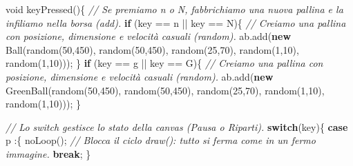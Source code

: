 \documentclass[
]{article}
\newenvironment{Shaded}{}{}
\newcommand{\CharTok}[1]{\textcolor[rgb]{0.25,0.44,0.63}{#1}}
\newcommand{\CommentTok}[1]{\textcolor[rgb]{0.38,0.63,0.69}{\textit{#1}}}
\newcommand{\ControlFlowTok}[1]{\textcolor[rgb]{0.00,0.44,0.13}{\textbf{#1}}}
\newcommand{\DataTypeTok}[1]{\textcolor[rgb]{0.56,0.13,0.00}{#1}}
\newcommand{\DecValTok}[1]{\textcolor[rgb]{0.25,0.63,0.44}{#1}}
\newcommand{\FunctionTok}[1]{\textcolor[rgb]{0.02,0.16,0.49}{#1}}
\newcommand{\KeywordTok}[1]{\textcolor[rgb]{0.00,0.44,0.13}{\textbf{#1}}}
\newcommand{\NormalTok}[1]{#1}
\newcommand{\OperatorTok}[1]{\textcolor[rgb]{0.40,0.40,0.40}{#1}}
\begin{document}
\begin{Shaded}
\begin{Highlighting}[]
\DataTypeTok{void} \FunctionTok{keyPressed}\OperatorTok{()\{} 
  \CommentTok{// Se premiamo \textquotesingle{}n\textquotesingle{} o \textquotesingle{}N\textquotesingle{}, fabbrichiamo una nuova pallina e la infiliamo nella borsa (add).}
  \ControlFlowTok{if} \OperatorTok{(}\NormalTok{key }\OperatorTok{==} \CharTok{\textquotesingle{}n\textquotesingle{}} \OperatorTok{||}\NormalTok{ key }\OperatorTok{==} \CharTok{\textquotesingle{}N\textquotesingle{}}\OperatorTok{)\{}
    \CommentTok{// Creiamo una pallina con posizione, dimensione e velocità casuali (random).}
\NormalTok{    ab}\OperatorTok{.}\FunctionTok{add}\OperatorTok{(}\KeywordTok{new} \FunctionTok{Ball}\OperatorTok{(}\FunctionTok{random}\OperatorTok{(}\DecValTok{50}\OperatorTok{,}\DecValTok{450}\OperatorTok{),} \FunctionTok{random}\OperatorTok{(}\DecValTok{50}\OperatorTok{,}\DecValTok{450}\OperatorTok{),} \FunctionTok{random}\OperatorTok{(}\DecValTok{25}\OperatorTok{,}\DecValTok{70}\OperatorTok{),} \FunctionTok{random}\OperatorTok{(}\DecValTok{1}\OperatorTok{,}\DecValTok{10}\OperatorTok{),} \FunctionTok{random}\OperatorTok{(}\DecValTok{1}\OperatorTok{,}\DecValTok{10}\OperatorTok{)));}
  \OperatorTok{\}}
  \ControlFlowTok{if} \OperatorTok{(}\NormalTok{key }\OperatorTok{==} \CharTok{\textquotesingle{}g\textquotesingle{}} \OperatorTok{||}\NormalTok{ key }\OperatorTok{==} \CharTok{\textquotesingle{}G\textquotesingle{}}\OperatorTok{)\{}
    \CommentTok{// Creiamo una pallina con posizione, dimensione e velocità casuali (random).}
\NormalTok{    ab}\OperatorTok{.}\FunctionTok{add}\OperatorTok{(}\KeywordTok{new} \FunctionTok{GreenBall}\OperatorTok{(}\FunctionTok{random}\OperatorTok{(}\DecValTok{50}\OperatorTok{,}\DecValTok{450}\OperatorTok{),} \FunctionTok{random}\OperatorTok{(}\DecValTok{50}\OperatorTok{,}\DecValTok{450}\OperatorTok{),} \FunctionTok{random}\OperatorTok{(}\DecValTok{25}\OperatorTok{,}\DecValTok{70}\OperatorTok{),} \FunctionTok{random}\OperatorTok{(}\DecValTok{1}\OperatorTok{,}\DecValTok{10}\OperatorTok{),} \FunctionTok{random}\OperatorTok{(}\DecValTok{1}\OperatorTok{,}\DecValTok{10}\OperatorTok{)));}
  \OperatorTok{\}}
  
  \CommentTok{// Lo switch gestisce lo stato della canvas (Pausa o Riparti).}
  \ControlFlowTok{switch}\OperatorTok{(}\NormalTok{key}\OperatorTok{)\{}
    \ControlFlowTok{case} \CharTok{\textquotesingle{}p\textquotesingle{}} \OperatorTok{:\{} 
      \FunctionTok{noLoop}\OperatorTok{();} \CommentTok{// Blocca il ciclo draw(): tutto si ferma come in un fermo immagine.}
      \ControlFlowTok{break}\OperatorTok{;}
    \OperatorTok{\}}
    

\end{Highlighting}
\end{Shaded}
\end{document}
